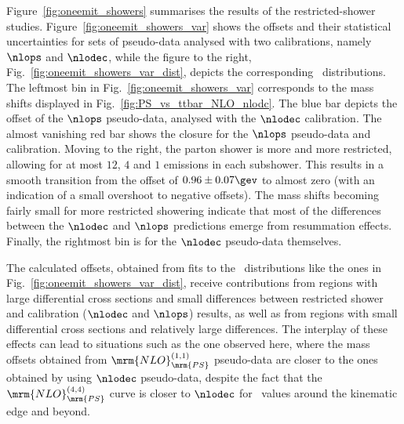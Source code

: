 \afterpage{\clearpage}

Figure~\ref{fig:oneemit_showers} summarises the results of the
restricted-shower studies.
%
 Figure~\ref{fig:oneemit_showers_var} shows the offsets and their
 statistical uncertainties for sets of pseudo-data analysed with two
 calibrations, namely $\nlops$ and $\nlodec$, while the figure to the
 right, Fig.~\ref{fig:oneemit_showers_var_dist}, depicts the
 corresponding \mlb\ distributions.
%
 The leftmost bin in Fig.~\ref{fig:oneemit_showers_var} corresponds to the
 mass shifts displayed in Fig.~\ref{fig:PS_vs_ttbar_NLO_nlodc}. The blue bar depicts the
 offset of the $\nlops$ pseudo-data, analysed with the $\nlodec$ calibration.
 The almost vanishing red bar shows the closure for the $\nlops$ pseudo-data and
 calibration.
%
 Moving to the right, the parton shower is more and more restricted,
 allowing for at
 most $12$, $4$ and $1$ emissions in each subshower.
%
 This results in a smooth transition from the offset of
 $0.96\pm0.07\gev$ to almost
 zero (with an indication of a small overshoot to negative offsets).
%
 The mass shifts becoming fairly small for more restricted showering
 indicate that most of the differences between the $\nlodec$ and
 $\nlops$ predictions emerge from resummation effects.
%
 Finally, the rightmost bin is for the $\nlodec$ pseudo-data themselves.

 The calculated offsets, obtained from fits to the \mlb\ distributions
 like the ones in Fig.~\ref{fig:oneemit_showers_var_dist},
 receive contributions from regions with large differential cross
 sections and small differences between restricted shower and
 calibration ($\nlodec$ and $\nlops$) results, as well as from regions
 with small differential cross sections and relatively large differences.
%
 The interplay of these effects can lead to situations such as the one
 observed here, where the mass offsets obtained from
 $\mrm{NLO}_\mrm{PS}^{(1,1)}$ pseudo-data are closer to the ones
 obtained by using $\nlodec$ pseudo-data, despite the fact that the
 $\mrm{NLO}_\mrm{PS}^{(4,4)}$ curve is closer to $\nlodec$ for \mlb\
 values around the kinematic edge and beyond.


